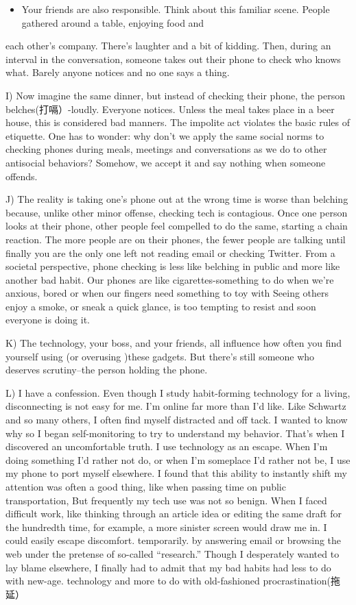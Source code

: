 \documentclass[UTF8,11pt]{ctexart}
\begin{document}
\begin{itemize}[leftmargin=2em,itemsep=.2em,topsep=.4em]\item[H.] Your friends are also responsible. Think about this familiar scene. People gathered around a table, enjoying food and
\end{itemize}

each other’s company. There’s laughter and a bit of kidding. Then, during an interval in the conversation, someone takes out their phone to check who knows what. Barely anyone notices and no one says a thing.


I) Now imagine the same dinner, but instead of checking their phone, the person belches(打嗝）-loudly. Everyone notices. Unless the meal takes place in a beer house, this is considered bad manners. The impolite act violates the basic rules of etiquette. One has to wonder: why don’t we apply the same social norms to checking phones during meals, meetings and conversations as we do to other antisocial behaviors? Somehow, we accept it and say nothing when someone offends.


J) The reality is taking one’s phone out at the wrong time is worse than belching because, unlike other minor offense, checking tech is contagious. Once one person looks at their phone, other people feel compelled to do the same, starting a chain reaction. The more people are on their phones, the fewer people are talking until finally you are the only one left not reading email or checking Twitter. From a societal perspective, phone checking is less like belching in public and more like another bad habit. Our phones are like cigarettes-something to do when we’re anxious, bored or when our fingers need something to toy with Seeing others enjoy a smoke, or sneak a quick glance, is too tempting to resist and soon everyone is doing it.


K) The technology, your boss, and your friends, all influence how often you find yourself using (or overusing )these gadgets. But there’s still someone who deserves scrutiny--the person holding the phone.


L) I have a confession. Even though I study habit-forming technology for a living, disconnecting is not easy for me. I'm online far more than I'd like. Like Schwartz and so many others, I often find myself distracted and off tack. I wanted to know why so I began self-monitoring to try to understand my behavior. That's when I discovered an uncomfortable truth. I use technology as an escape. When I'm doing something I'd rather not do, or when I'm someplace I'd rather not be, I use my phone to port myself elsewhere. I found that this ability to instantly shift my attention was often a good thing, like when passing time on public transportation, But frequently my tech use was not so benign. When I faced difficult work, like thinking through an article idea or editing the same draft for the hundredth time, for example, a more sinister screen would draw me in. I could easily escape discomfort. temporarily. by answering email or browsing the web under the pretense of so-called “research.” Though I desperately wanted to lay blame elsewhere, I finally had to admit that my bad habits had less to do with new-age. technology and more to do with old-fashioned procrastination(拖延）
\end{document}
